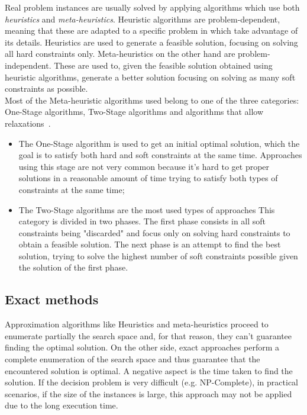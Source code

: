 Real problem instances are usually solved by applying algorithms which use both \textit{heuristics} and \textit{meta-heuristics}. Heuristic algorithms are problem-dependent, meaning that these are adapted to a specific problem in which take advantage of its details. Heuristics are used to generate a feasible solution, focusing on solving all hard constraints only. Meta-heuristics on the other hand are problem-independent. These are used to, given the feasible solution obtained using heuristic algorithms, generate a better solution focusing on solving as many soft constraints as possible.\\

Most of the Meta-heuristic algorithms used belong to one of the three categories: One-Stage algorithms, Two-Stage algorithms and algorithms that allow relaxations~\cite{Lewis2007}. 
\begin{itemize}
  \item The One-Stage algorithm is used to get an initial optimal solution, which the goal is to satisfy both hard and soft constraints at the same time. Approaches using this stage are not very common because it's hard to get proper solutions in a reasonable amount of time trying to satisfy both types of constraints at the same time;
  \item The Two-Stage algorithms are the most used types of approaches This category is divided in two phases. The first phase consists in all soft constraints being "discarded" and focus only on solving hard constraints to obtain a feasible solution. The next phase is an attempt to find the best solution, trying to solve the highest number of soft constraints possible given the solution of the first phase.
\end{itemize}

\subsection{Exact methods}
\label{subsection:exactmethods}
Approximation algorithms like Heuristics and meta-heuristics proceed to enumerate partially the search space and, for that reason, they can't guarantee finding the optimal solution. On the other side, exact approaches perform a complete enumeration of the search space and thus guarantee that the encountered solution is optimal. A negative aspect is the time taken to find the solution. If the decision problem is very difficult (e.g. NP-Complete), in practical scenarios, if the size of the instances is large, this approach may not be applied due to the long execution time.\\

